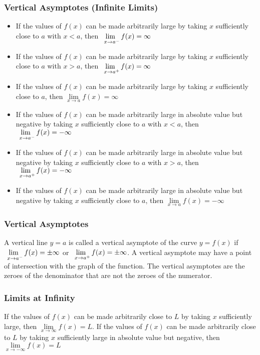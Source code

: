 \documentclass{article}
\begin{document}
	\subsubsection{Vertical Asymptotes (Infinite Limits)}
	\begin{itemize}
		\item If the values of $f(x)$ can be made arbitrarily large by taking $x$ sufficiently close to $a$ with $x<a$, then $\lim\limits_{\hspace{1ex}x\to a^-}f(x)=\infty$
		\item If the values of $f(x)$ can be made arbitrarily large by taking $x$ sufficiently close to $a$ with $x>a$, then $\lim\limits_{\hspace{1ex}x\to a^+}f(x)=\infty$
		\item If the values of $f(x)$ can be made arbitrarily large by taking $x$ sufficiently close to $a$, then $\lim\limits_{x\to a}f(x)=\infty$
		\item If the values of $f(x)$ can be made arbitrarily large in absolute value but negative by taking $x$ sufficiently close to $a$ with $x<a$, then $\lim\limits_{\hspace{1ex}x\to a^-}f(x)=-\infty$
		\item If the values of $f(x)$ can be made arbitrarily large in absolute value but negative by taking $x$ sufficiently close to $a$ with $x>a$, then $\lim\limits_{\hspace{1ex}x\to a^+}f(x)=-\infty$
		\item If the values of $f(x)$ can be made arbitrarily large in absolute value but negative by taking $x$ sufficiently close to $a$, then $\lim\limits_{x\to a}f(x)=-\infty$
	\end{itemize}
	\subsubsection{Vertical Asymptotes}
	A vertical line $y=a$ is called a vertical asymptote of the curve $y=f(x)$ if $\lim\limits_{\hspace{1ex}x\to a^-}f(x)=\pm\infty$ or $\lim\limits_{\hspace{1ex}x\to a^+}f(x)=\pm\infty$. A vertical asymptote may have a point of intersection with the graph of the function. The vertical asymptotes are the zeroes of the denominator that are not the zeroes of the numerator.
	\subsubsection{Limits at Infinity}
	If the values of $f(x)$ can be made arbitrarily close to $L$ by taking $x$ sufficiently large, then $\lim\limits_{x\to\infty}f(x)=L$. If the values of $f(x)$ can be made arbitrarily close to $L$ by taking $x$ sufficiently large in absolute value but negative, then $\lim\limits_{x\to-\infty}f(x)=L$
\end{document}

